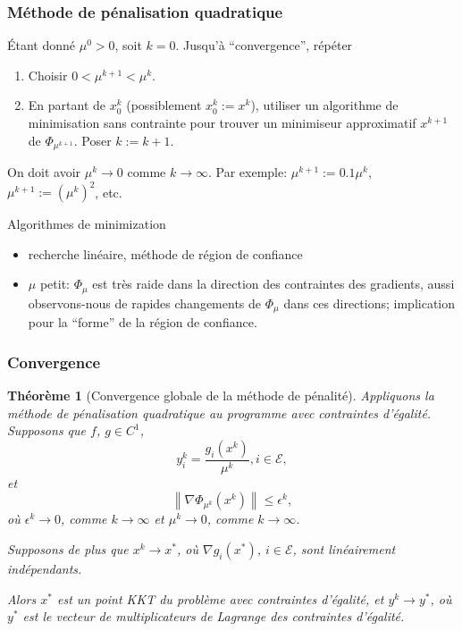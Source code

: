 \documentclass[t,usepdftitle=false]{beamer}
\newtheorem{thm}{Théorème}
\def\cE{\mathcal{E}}
\begin{document}
\begin{frame}
\frametitle{Méthode de pénalisation quadratique}

Étant donné $\mu^0 > 0$, soit $k = 0$.
Jusqu'à ``convergence'', répéter
\begin{enumerate}
\item
Choisir $0 < \mu^{k+1} < \mu^k$.
\item
En partant de $x_0^k$ (possiblement $x_0^k := x^k$), utiliser un algorithme de minimisation sans contrainte pour trouver un minimiseur approximatif $x^{k+1}$ de $\Phi_{\mu^{k+1}}$.
Poser $k := k+1$.
\end{enumerate}

On doit avoir $\mu^k \rightarrow 0$ comme $k \rightarrow \infty$.
Par exemple: $\mu^{k+1} := 0.1\mu^k$, $\mu^{k+1} := (\mu^k)^2$, etc.

\mbox{}

Algorithmes de minimization
\begin{itemize}
\item
recherche linéaire, méthode de région de confiance
\item
$\mu$ petit: $\Phi_{\mu}$ est très raide dans la direction des contraintes des gradients, aussi observons-nous de rapides changements de $\Phi_{\mu}$ dans ces directions; implication pour la ``forme'' de la région de confiance.
\end{itemize}

\end{frame}

\begin{frame}
\frametitle{Convergence}

\begin{thm}[Convergence globale de la méthode de pénalité]
Appliquons la méthode de pénalisation quadratique au programme avec contraintes d'égalité.
Supposons que $f$, $g \in C^1$,
$$
y_i^k = \frac{g_i(x^k)}{\mu^k}, i \in \cE,
$$
et
$$
\left\| \nabla \Phi_{\mu^k}(x^k) \right\| \leq \epsilon^k,
$$
où $\epsilon^k \rightarrow 0$, comme $k \rightarrow \infty$
et $\mu^k \rightarrow 0$, comme $k \rightarrow \infty$.

Supposons de plus que $x^k \rightarrow x^*$, où $\nabla g_i(x^*)$, $i \in \cE$, sont linéairement indépendants.

Alors $x^*$ est un point KKT du problème avec contraintes d'égalité, et $y^k \rightarrow y^*$, où $y^*$ est le vecteur de multiplicateurs de Lagrange des contraintes d'égalité.
\end{thm}

\end{frame}
\end{document}

